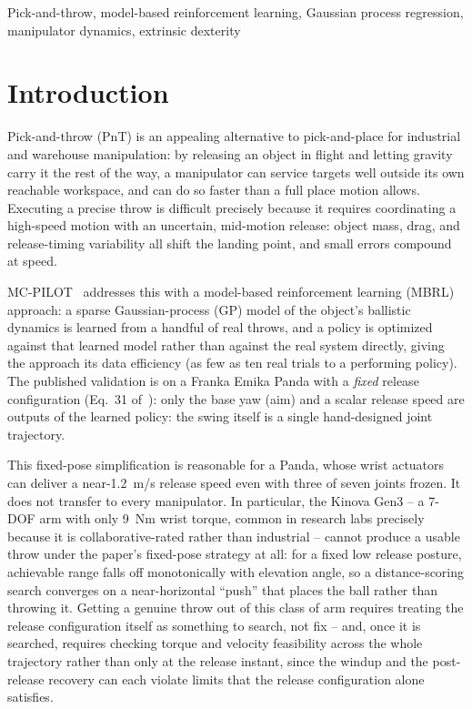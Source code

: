 \documentclass[conference]{IEEEtran}
\begin{document}
\begin{IEEEkeywords}
Pick-and-throw, model-based reinforcement learning, Gaussian process
regression, manipulator dynamics, extrinsic dexterity
\end{IEEEkeywords}

\section{Introduction}

Pick-and-throw (PnT) is an appealing alternative to pick-and-place for
industrial and warehouse manipulation: by releasing an object in flight and
letting gravity carry it the rest of the way, a manipulator can service
targets well outside its own reachable workspace, and can do so faster than
a full place motion allows. Executing a precise throw is difficult
precisely because it requires coordinating a high-speed motion with an
uncertain, mid-motion release: object mass, drag, and release-timing
variability all shift the landing point, and small errors compound at
speed.

MC-PILOT~\cite{turcato2025mcpilot} addresses this with a model-based
reinforcement learning (MBRL) approach: a sparse Gaussian-process (GP) model
of the object's ballistic dynamics is learned from a handful of real
throws, and a policy is optimized against that learned model rather than
against the real system directly, giving the approach its data efficiency
(as few as ten real trials to a performing policy). The published
validation is on a Franka Emika Panda with a \emph{fixed} release
configuration (Eq.~31 of~\cite{turcato2025mcpilot}): only the base yaw
(aim) and a scalar release speed are outputs of the learned policy: the
swing itself is a single hand-designed joint trajectory.

This fixed-pose simplification is reasonable for a Panda, whose wrist
actuators can deliver a near-1.2~m/s release speed even with three of seven
joints frozen. It does not transfer to every manipulator. In particular,
the Kinova Gen3 -- a 7-DOF arm with only 9~Nm wrist torque, common in
research labs precisely because it is collaborative-rated rather than
industrial -- cannot produce a usable throw under the paper's fixed-pose
strategy at all: for a fixed low release posture, achievable range falls
off monotonically with elevation angle, so a distance-scoring search
converges on a near-horizontal ``push'' that places the ball rather than
throwing it. Getting a genuine throw out of this class of arm requires
treating the release configuration itself as something to search, not fix
-- and, once it is searched, requires checking torque and velocity
feasibility across the whole trajectory rather than only at the release
instant, since the windup and the post-release recovery can each violate
limits that the release configuration alone satisfies.
\end{document}
